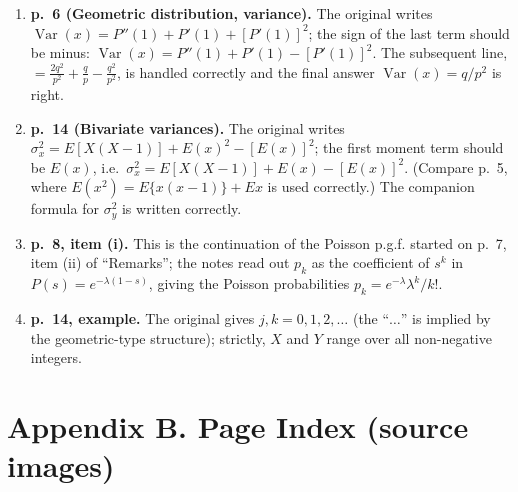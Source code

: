\documentclass[
]{article}
\begin{document}
\begin{enumerate}
\def\labelenumi{\arabic{enumi}.}
\item
  \textbf{p.~6 (Geometric distribution, variance).} The original writes
  \(\operatorname{Var}(x) = P''(1) + P'(1) + \left[P'(1)\right]^2\); the
  sign of the last term should be minus:
  \(\operatorname{Var}(x) = P''(1) + P'(1) - \left[P'(1)\right]^2\). The
  subsequent line,
  \(= \frac{2q^2}{p^2} + \frac{q}{p} - \frac{q^2}{p^2}\), is handled
  correctly and the final answer \(\operatorname{Var}(x) = q/p^2\) is
  right.
\item
  \textbf{p.~14 (Bivariate variances).} The original writes
  \(\sigma_x^2 = E[X(X-1)] + E(x)^2 - \left[E(x)\right]^2\); the first
  moment term should be \(E(x)\),
  i.e.~\(\sigma_x^2 = E[X(X-1)] + E(x) - \left[E(x)\right]^2\). (Compare
  p.~5, where \(E(x^2) = E\{x(x-1)\} + Ex\) is used correctly.) The
  companion formula for \(\sigma_y^2\) is written correctly.
\item
  \textbf{p.~8, item (i).} This is the continuation of the Poisson
  p.g.f. started on p.~7, item (ii) of ``Remarks''; the notes read out
  \(p_k\) as the coefficient of \(s^k\) in \(P(s) = e^{-\lambda(1-s)}\),
  giving the Poisson probabilities \(p_k = e^{-\lambda}\lambda^k/k!\).
\item
  \textbf{p.~14, example.} The original gives \(j, k = 0, 1, 2, \ldots\)
  (the ``\(\ldots\)'' is implied by the geometric-type structure);
  strictly, \(X\) and \(Y\) range over all non-negative integers.
\end{enumerate}

\section{Appendix B. Page Index (source
images)}\label{appendix-b.-page-index-source-images}
\end{document}
